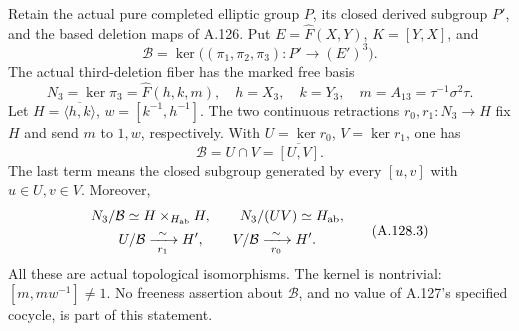 Retain the actual pure completed elliptic group \(P\), its closed
derived subgroup \(P'\), and the based deletion maps of A.126.
Put \(E=\widehat F(X,Y)\), \(K=[Y,X]\), and
\[
 \mathcal B=\ker\bigl((\pi_1,\pi_2,\pi_3):P'\longrightarrow(E')^3\bigr).
\]
The actual third-deletion fiber has the marked free basis
\[
 N_3=\ker\pi_3=\widehat F(h,k,m),\quad
 h=X_3,\quad k=Y_3,\quad m=A_{13}=\tau^{-1}\sigma^2\tau.
                                                        \tag{A.128.1}
\]
Let \(H=\overline{\langle h,k\rangle}\), \(w=[k^{-1},h^{-1}]\).
The two continuous retractions \(r_0,r_1:N_3\to H\) fix
\(H\) and send \(m\) to \(1,w\), respectively. With
\(U=\ker r_0\), \(V=\ker r_1\), one has
\[
 \boxed{\mathcal B=U\cap V=\overline{[U,V]}.}               \tag{A.128.2}
\]
The last term means the closed subgroup generated by every
\([u,v]\) with \(u\in U,v\in V\). Moreover,
\[
 \begin{gathered}
 N_3/\mathcal B\simeq H\times_{H_{\rm ab}}H,\qquad
 N_3/(UV)\simeq H_{\rm ab},\\
 U/\mathcal B\xrightarrow[\ r_1\ ]{\sim}H',\qquad
 V/\mathcal B\xrightarrow[\ r_0\ ]{\sim}H'.
 \end{gathered}                                           \tag{A.128.3}
\]
All these are actual topological isomorphisms. The kernel is
nontrivial: \([m,mw^{-1}]\ne1\). No freeness assertion about
\(\mathcal B\), and no value of A.127's specified cocycle,
is part of this statement.

